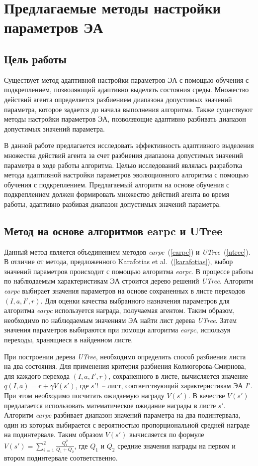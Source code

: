 \chapter{Предлагаемые методы настройки параметров ЭА}
\label{proposed_chapter}
\section{Цель работы}
Существует метод адаптивной настройки параметров ЭА с помощью обучения с подкреплением, позволяющий адаптивно выделять состояния среды. Множество действий агента определяется разбиением диапазона допустимых значений параметра, которое задается до начала выполнения алгоритма. Также существуют методы настройки параметров ЭА, позволяющие адаптивно разбивать диапазон допустимых значений параметра.

В данной работе предлагается исследовать эффективность адаптивного выделения множества действий агента за счет разбиения диапазона допустимых значений параметра в ходе работы алгоритма. Целью исследований являлась разработка метода адаптивной настройки параметров эволюционного алгоритма с помощью обучения с подкреплением. Предлагаемый алгоритм на основе обучения с подкреплением должен формировать множество действий агента во время работы, адаптивно разбивая диапазон допустимых значений параметра.

\section{Метод на основе алгоритмов earpc и UTree}
\label{composing_method}
Данный метод является объединением методов \textit{earpc}~(\ref{earpc}) и \textit{UTree}~(\ref{utree}). В отличие от метода, предложенного Karafotias et al.~(\ref{karafotias}), выбор значений параметров происходит с помощью алгоритма \textit{earpc}. В процессе работы по наблюдаемым характеристикам ЭА строится дерево решений \textit{UTree}. Алгоритм \textit{earpc} выбирает значения параметров на основе сохраненных в листе переходов $(I, a, I', r)$. Для оценки качества выбранного назначения параметров для алгоритма \textit{earpc} используется награда, получаемая агентом. Таким образом, необходимо по наблюдаемым значениям ЭА найти лист дерева \textit{UTree}. Затем значения параметров выбираются при помощи алгоритма \textit{earpc}, используя переходы, хранящиеся в найденном листе.

При построении дерева \textit{UTree}, необходимо определить способ разбиения листа на два состояния. Для применения критерия разбиения Колмогорова-Смирнова, для каждого перехода $(I, a, I', r)$, сохраненного в листе, вычисляется значение $q(I, a) = r + \gamma V(s')$, где $s'$!~-- лист, соответствующий характеристикам ЭА $I'$. При этом необходимо посчитать ожидаемую награду $V(s')$. В качестве $V(s')$ предлагается использовать математическое ожидание награды в листе $s'$. Алгоритм \textit{earpc} разбивает диапазон значений параметра на два подинтервала, один из которых выбирается с вероятностью пропорциональной средней награде на подинтервале. Таким образом $V(s')$ вычисляется по формуле $V(s') = \sum\limits_{i = 1}^2{\frac{Q_i^2}{Q_1 + Q_2}}$, где $Q_1$ и $Q_2$ средние значения награды на первом и втором подинтервале соответственно. 

